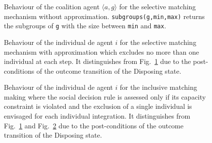 \documentclass[a4paper,11pt,landscape]{article}
\begin{document}
\begin{figure}
\begin{center}
  \scalebox{.7}{}
\end{center}
\label{algo:coalitionBehaviourSelectiveExact}
\caption{Behaviour of the coalition agent $\langle a, g \rangle$ for
  the selective matching mechanism without approximation.
  \texttt{subgroups(g,min,max)} returns the subgroups of
  \texttt{g} with the size between
  \texttt{min} and \texttt{max}.}
\end{figure}

\begin{figure}
\begin{center}
  \scalebox{.7}{}
\end{center}
\label{algo:coalitionBehaviourSelectiveApproximation}
\caption{Behaviour of the individual de agent $i$ for the selective
  matching mechanism with approximation which excludes no more than
  one individual at each step. It distinguishes from
  Fig.~\ref{algo:coalitionBehaviourSelectiveExact} due to the
  post-conditions of the outcome transition of the Disposing state.}%
\end{figure}

\begin{figure}
\begin{center}
  \scalebox{.7}{}
\end{center}
\label{algo:coalitionBehaviourInclusive}
\caption{Behaviour of the individual de agent $i$ for the inclusive
  matching making where the social decision rule is assessed only if
  its capacity constraint is violated and the exclusion of a single
  individual is envisaged for each individual integration. It
  distinguishes from Fig.~\ref{algo:coalitionBehaviourSelectiveExact}
  and Fig.~\ref{algo:coalitionBehaviourSelectiveApproximation} due to
  the post-conditions of the outcome transition of the Disposing
  state.}%
\end{figure}
\end{document}

